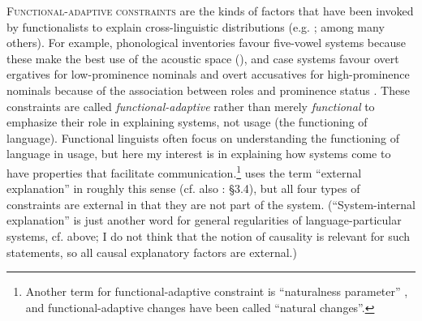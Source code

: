 \documentclass[output=paper]{langsci/langscibook}
\begin{document}
\textsc{Functional-adaptive constraints} are the kinds of factors that have been invoked by functionalists to explain cross-linguistic distributions (e.g. \citealt{Tomlin1986,Malchukov2008,Hawkins2014}; among many others). For example, phonological inventories favour five-vowel systems because these make the best use of the acoustic space (\citealt{DeBoer2001}), and case systems favour overt ergatives for low-prominence nominals and overt accusatives for high-prominence nominals because of the association between roles and prominence status \citep{Dixon1994}. These constraints are called \textit{functional-adaptive} rather than merely \textit{functional} to emphasize their role in explaining systems, not usage (the functioning of language). Functional linguists often focus on understanding the functioning of language in usage, but here my interest is in explaining how systems come to have properties that facilitate communication.\footnote{Another term for functional-adaptive constraint is “naturalness parameter” \citep{DresslerEtAl1987}, and functional-adaptive changes have been called “natural changes”.} \citet{Good2008} uses the term “external explanation” in roughly this sense (cf. also \citealt{Newmeyer1998}: §3.4), but all four types of constraints are external in that they are not part of the system. (“System-internal explanation” is just another word for general regularities of language-particular systems, cf.  above; I do not think that the notion of causality is relevant for such statements, so all causal explanatory factors are external.)
\end{document}
